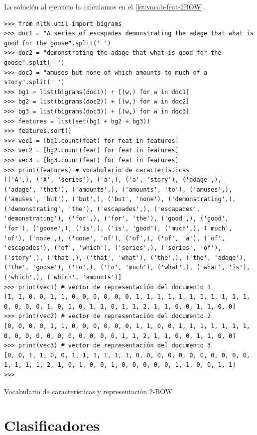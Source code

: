 La solución al ejercicio la calculamos en el \autoref{lst:vocab-feat-2BOW}.

\begin{listing}[htbp]
\begin{verbatim}
>>> from nltk.util import bigrams
>>> doc1 = "A series of escapades demonstrating the adage that what is good for the goose".split(' ')
>>> doc2 = "demonstrating the adage that what is good for the goose".split(' ')
>>> doc3 = "amuses but none of which amounts to much of a story".split(' ')
>>> bg1 = list(bigrams(doc1)) + [(w,) for w in doc1]
>>> bg2 = list(bigrams(doc2)) + [(w,) for w in doc2]
>>> bg3 = list(bigrams(doc3)) + [(w,) for w in doc3]
>>> features = list(set(bg1 + bg2 + bg3))
>>> features.sort()
>>> vec1 = [bg1.count(feat) for feat in features]
>>> vec2 = [bg2.count(feat) for feat in features]
>>> vec3 = [bg3.count(feat) for feat in features]
>>> print(features) # vocabulario de características
[('A',), ('A', 'series'), ('a',), ('a', 'story'), ('adage',), ('adage', 'that'), ('amounts',), ('amounts', 'to'), ('amuses',), ('amuses', 'but'), ('but',), ('but', 'none'), ('demonstrating',), ('demonstrating', 'the'), ('escapades',), ('escapades', 'demonstrating'), ('for',), ('for', 'the'), ('good',), ('good', 'for'), ('goose',), ('is',), ('is', 'good'), ('much',), ('much', 'of'), ('none',), ('none', 'of'), ('of',), ('of', 'a'), ('of', 'escapades'), ('of', 'which'), ('series',), ('series', 'of'), ('story',), ('that',), ('that', 'what'), ('the',), ('the', 'adage'), ('the', 'goose'), ('to',), ('to', 'much'), ('what',), ('what', 'is'), ('which',), ('which', 'amounts')]
>>> print(vec1) # vector de representación del documento 1
[1, 1, 0, 0, 1, 1, 0, 0, 0, 0, 0, 0, 1, 1, 1, 1, 1, 1, 1, 1, 1, 1, 1, 0, 0, 0, 0, 1, 0, 1, 0, 1, 1, 0, 1, 1, 2, 1, 1, 0, 0, 1, 1, 0, 0]
>>> print(vec2) # vector de representación del documento 2
[0, 0, 0, 0, 1, 1, 0, 0, 0, 0, 0, 0, 1, 1, 0, 0, 1, 1, 1, 1, 1, 1, 1, 0, 0, 0, 0, 0, 0, 0, 0, 0, 0, 0, 1, 1, 2, 1, 1, 0, 0, 1, 1, 0, 0]
>>> print(vec3) # vector de representación del documento 3
[0, 0, 1, 1, 0, 0, 1, 1, 1, 1, 1, 1, 0, 0, 0, 0, 0, 0, 0, 0, 0, 0, 0, 1, 1, 1, 1, 2, 1, 0, 1, 0, 0, 1, 0, 0, 0, 0, 0, 1, 1, 0, 0, 1, 1]
>>> 
\end{verbatim}
\caption{Vocabulario de características y representación 2-BOW}
\label{lst:vocab-feat-2BOW}
\end{listing}


 


\section{Clasificadores}

